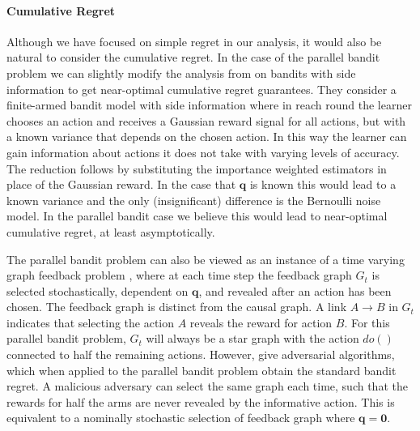 \documentclass[11pt,a4paper,oneside]{book}
\renewcommand{\vec}[1]{\boldsymbol{#1}}
\theoremstyle{plain}
\theoremstyle{definition}
\begin{document}
\paragraph{Cumulative Regret}
Although we have focused on simple regret in our analysis, it would also be natural to consider the cumulative regret. In the case of the parallel bandit problem we can slightly modify the analysis from \citep{wu2015online} on bandits with side information 
to get near-optimal cumulative regret guarantees. They consider a finite-armed bandit model with side information where in reach round the learner chooses an action and receives a Gaussian reward signal for all actions, but with a known variance that depends on the chosen action. In this way the learner can gain information about actions it does not take with varying levels of accuracy. The reduction follows by substituting the importance weighted estimators in place of the Gaussian reward. In the case that $\vec{q}$ is known this would lead to a known variance and the only (insignificant) difference is the Bernoulli noise model. In the parallel bandit case we believe this would lead to near-optimal cumulative regret,
at least asymptotically. 


The parallel bandit problem can also be viewed as an instance of a time varying graph feedback problem \citep{Alon2015,Kocak2014}, where at each time step the feedback graph $G_t$ is selected stochastically, dependent on $\boldsymbol{q}$, and revealed after an action has been chosen. The feedback graph is distinct from the causal graph. A link $A \rightarrow B$ in $G_t$ indicates that selecting the action $A$ reveals the reward for action $B$. For this parallel bandit problem, $G_t$ will always be a star graph with the action $do()$ connected to half the remaining actions. However, \citet{Alon2015,Kocak2014} give adversarial algorithms, which when applied to the parallel bandit problem obtain the standard bandit regret. A malicious adversary can select the same graph each time, such that the rewards for half the arms are never revealed by the informative action. This is equivalent to a nominally stochastic selection of feedback graph where $\boldsymbol{q} = \boldsymbol{0}$. 
\end{document}
